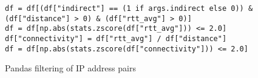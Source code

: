 \begin{code}[h]
    \centering
    \begin{verbatim}
df = df[(df["indirect"] == (1 if args.indirect else 0)) & (df["distance"] > 0) & (df["rtt_avg"] > 0)]
df = df[np.abs(stats.zscore(df["rtt_avg"])) <= 2.0]
df["connectivity"] = df["rtt_avg"] / df["distance"]
df = df[np.abs(stats.zscore(df["connectivity"])) <= 2.0]
    \end{verbatim}
    \caption{Pandas filtering of IP address pairs}
    \label{code:pandas_filtering_ip_pair}
\end{code}



